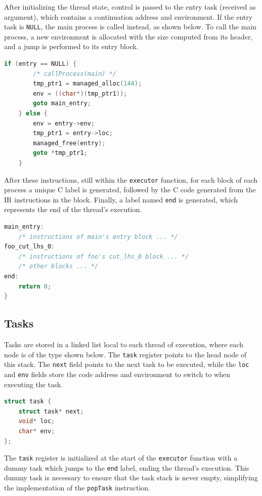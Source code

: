After initializing the thread state, control is passed to the entry task (received as argument), which contains a continuation address and environment. If the entry task is \texttt{NULL}, the main process is called instead, as shown below. To call the main process, a new environment is allocated with the size computed from its header, and a jump is performed to its entry block.

\begin{lstlisting}[language=C, frame=bottom]
    if (entry == NULL) {
        /* callProcess(main) */
        tmp_ptr1 = managed_alloc(144);
        env = ((char*)(tmp_ptr1));
        goto main_entry;
    } else {
        env = entry->env;
        tmp_ptr1 = entry->loc;
        managed_free(entry);
        goto *tmp_ptr1;
    }
\end{lstlisting}

After these instructions, still within the \texttt{executor} function, for each block of each process a unique C label is generated, followed by the C code generated from the \ac{IR} instructions in the block. Finally, a label named \texttt{end} is generated, which represents the end of the thread's execution.

\begin{lstlisting}[language=C, frame=bottom]
main_entry:
    /* instructions of main's entry block ... */
foo_cut_lhs_0:
    /* instructions of foo's cut_lhs_0 block ... */
    /* other blocks ... */
end:
    return 0;
}
\end{lstlisting}

\subsection{Tasks}

Tasks are stored in a linked list local to each thread of execution, where each node is of the type shown below. The \texttt{task} register points to the head node of this stack. The \texttt{next} field points to the next task to be executed, while the \texttt{loc} and \texttt{env} fields store the code address and environment to switch to when executing the task. 

\begin{lstlisting}[language=C, frame=bottom]
struct task {
    struct task* next;
    void* loc;
    char* env;
};
\end{lstlisting}

The \texttt{task} register is initialized at the start of the \texttt{executor} function with a dummy task which jumps to the \texttt{end} label, ending the thread's execution. This dummy task is necessary to ensure that the task stack is never empty, simplifying the implementation of the \texttt{popTask} instruction.


